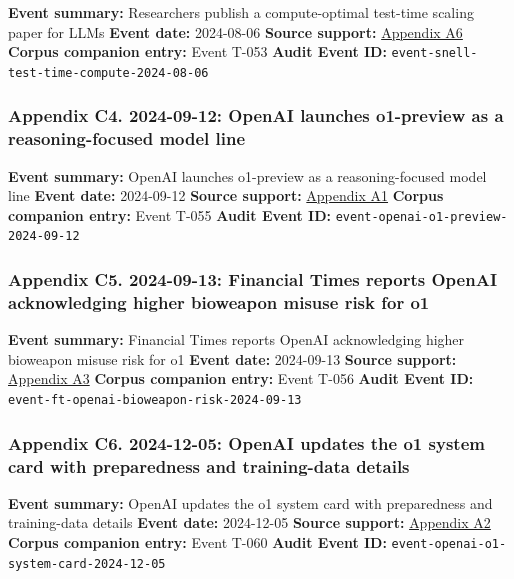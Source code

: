 \documentclass[
  american,
  11pt,
  letterpaper,
]{article}
\begin{document}
\textbf{Event summary:} Researchers publish a compute-optimal test-time
scaling paper for LLMs \textbf{Event date:} 2024-08-06 \textbf{Source
support:}
\hyperref[appendix-a6-scaling-llm-test-time-compute-optimally-can-be-more-effective-than-scaling-model-parameters]{Appendix
A6} \textbf{Corpus companion entry:} Event T-053 \textbf{Audit Event
ID:} \texttt{event-snell-test-time-compute-2024-08-06}

\subsubsection{Appendix C4. 2024-09-12: OpenAI launches o1-preview as a
reasoning-focused model
line}\label{appendix-c4-2024-09-12-openai-launches-o1-preview-as-a-reasoning-focused-model-line}

\textbf{Event summary:} OpenAI launches o1-preview as a
reasoning-focused model line \textbf{Event date:} 2024-09-12
\textbf{Source support:}
\hyperref[appendix-a1-learning-to-reason-with-llms]{Appendix A1}
\textbf{Corpus companion entry:} Event T-055 \textbf{Audit Event ID:}
\texttt{event-openai-o1-preview-2024-09-12}

\subsubsection{Appendix C5. 2024-09-13: Financial Times reports OpenAI
acknowledging higher bioweapon misuse risk for
o1}\label{appendix-c5-2024-09-13-financial-times-reports-openai-acknowledging-higher-bioweapon-misuse-risk-for-o1}

\textbf{Event summary:} Financial Times reports OpenAI acknowledging
higher bioweapon misuse risk for o1 \textbf{Event date:} 2024-09-13
\textbf{Source support:}
\hyperref[appendix-a3-openai-acknowledges-new-models-increase-risk-of-misuse-to-create-bioweapons]{Appendix
A3} \textbf{Corpus companion entry:} Event T-056 \textbf{Audit Event
ID:} \texttt{event-ft-openai-bioweapon-risk-2024-09-13}

\subsubsection{Appendix C6. 2024-12-05: OpenAI updates the o1 system
card with preparedness and training-data
details}\label{appendix-c6-2024-12-05-openai-updates-the-o1-system-card-with-preparedness-and-training-data-details}

\textbf{Event summary:} OpenAI updates the o1 system card with
preparedness and training-data details \textbf{Event date:} 2024-12-05
\textbf{Source support:}
\hyperref[appendix-a2-openai-o1-system-card]{Appendix A2} \textbf{Corpus
companion entry:} Event T-060 \textbf{Audit Event ID:}
\texttt{event-openai-o1-system-card-2024-12-05}
\end{document}
